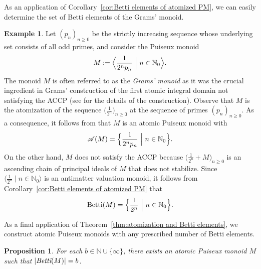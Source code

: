 \documentclass[12pt]{amsart}
\newtheorem{prop}[theorem]{Proposition}
\theoremstyle{definition}
\newtheorem{example}[theorem]{Example}
\numberwithin{equation}{section}
\newcommand{\nn}{\mathbb{N}}
\begin{document}
As an application of Corollary~\ref{cor:Betti elements of atomized PM}, we can easily determine the set of Betti elements of the Grams' monoid.

\begin{example} \label{ex:Grams' monoid}
	Let $(p_n)_{n \ge 0}$ be the strictly increasing sequence whose underlying set consists of all odd primes, and consider the Puiseux monoid
	\[
		M := \Big\langle \frac{1}{2^n p_n} \ \Big{|} \ n \in \nn_0 \Big\rangle.
	\]
	The monoid $M$ is often referred to as the \emph{Grams' monoid} as it was the crucial ingredient in Grams' construction of the first atomic integral domain not satisfying the ACCP (see \cite{aG74} for the details of the construction). Observe that $M$ is the atomization of the sequence $\big( \frac{1}{2^n}\big)_{n \ge 0}$ at the sequence of primes $(p_n)_{n \ge 0}$. As a consequence, it follows from \cite[Proposition~3.1]{GL23} that $M$ is an atomic Puiseux monoid with
	\[
		\mathcal{A}(M) = \Big\{ \frac{1}{2^n p_n} \ \Big{|} \ n \in \nn_0 \Big\}.
	\]
	On the other hand, $M$ does not satisfy the ACCP because $\big( \frac{1}{2^n} + M \big)_{n \ge 0}$ is an ascending chain of principal ideals of $M$ that does not stabilize. Since $\big\langle \frac{1}{2^n} \mid n \in \nn_0 \big\rangle$ is an antimatter valuation monoid, it follows from Corollary~\ref{cor:Betti elements of atomized PM} that
	\[
		\text{Betti}(M) = \Big\{\frac{1}{2^n} \ \Big{|} \ n \in \nn_0 \Big\}.
	\]
	
\end{example}

As a final application of Theorem~\ref{thm:atomization and Betti elements}, we construct atomic Puiseux monoids with any prescribed number of Betti elements.

\begin{prop} \label{prop:sizes of Betti sets}
	For each $b \in \nn \cup \{\infty\}$, there exists an atomic Puiseux monoid $M$ such that $|\emph{Betti}(M)| = b$.
\end{prop}
\end{document}
